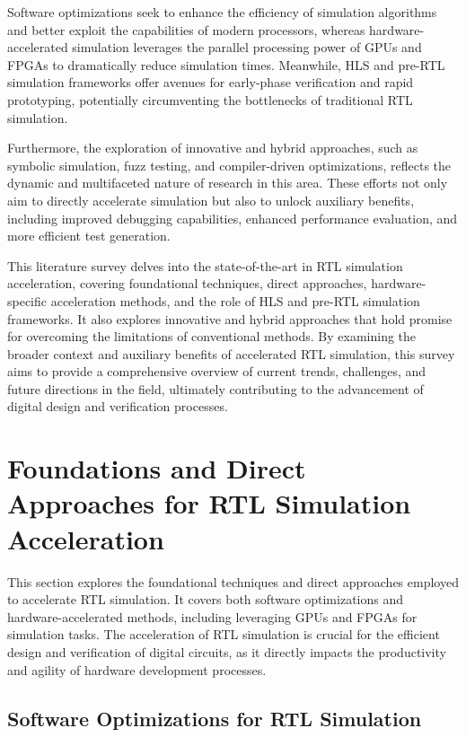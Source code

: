 \documentclass[conference]{IEEEtran}
\begin{document}
Software optimizations seek to enhance the efficiency of simulation algorithms and better exploit the capabilities of modern processors, whereas hardware-accelerated simulation leverages the parallel processing power of GPUs and FPGAs to dramatically reduce simulation times. Meanwhile, HLS and pre-RTL simulation frameworks offer avenues for early-phase verification and rapid prototyping, potentially circumventing the bottlenecks of traditional RTL simulation.

Furthermore, the exploration of innovative and hybrid approaches, such as symbolic simulation, fuzz testing, and compiler-driven optimizations, reflects the dynamic and multifaceted nature of research in this area. These efforts not only aim to directly accelerate simulation but also to unlock auxiliary benefits, including improved debugging capabilities, enhanced performance evaluation, and more efficient test generation.

This literature survey delves into the state-of-the-art in RTL simulation acceleration, covering foundational techniques, direct approaches, hardware-specific acceleration methods, and the role of HLS and pre-RTL simulation frameworks. It also explores innovative and hybrid approaches that hold promise for overcoming the limitations of conventional methods. By examining the broader context and auxiliary benefits of accelerated RTL simulation, this survey aims to provide a comprehensive overview of current trends, challenges, and future directions in the field, ultimately contributing to the advancement of digital design and verification processes.
\section{Foundations and Direct Approaches for RTL Simulation Acceleration}

This section explores the foundational techniques and direct approaches employed to accelerate RTL simulation. It covers both software optimizations and hardware-accelerated methods, including leveraging GPUs and FPGAs for simulation tasks. The acceleration of RTL simulation is crucial for the efficient design and verification of digital circuits, as it directly impacts the productivity and agility of hardware development processes. 

\subsection{Software Optimizations for RTL Simulation}
\end{document}

